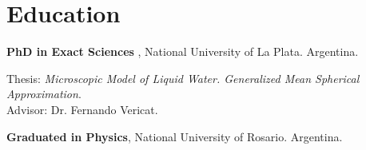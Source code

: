 \section*{Education}

\begin{timeline}
 \textbf{PhD in Exact Sciences }, National University of La Plata. Argentina.

Thesis: \emph{Microscopic Model of Liquid Water. Generalized Mean Spherical Approximation}. \\Advisor: Dr. Fernando Vericat.

 \textbf{Graduated in Physics}, National University of Rosario. Argentina.
\end{timeline}